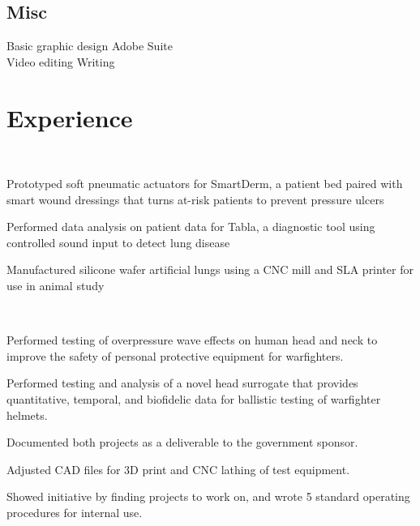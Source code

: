 \documentclass[]{deedy-resume}
\begin{document}
\begin{minipage}[t]{0.3\textwidth}
\subsection{Misc}
Basic graphic design \textbullet{} Adobe Suite\\
Video editing \textbullet{} Writing\\
\sectionsep

%
%

\end{minipage} 
\hfill
\begin{minipage}[t]{0.66\textwidth} 


\section{Experience}
 \\
\vspace{\topsep} %
\begin{tightemize}
\item Prototyped soft pneumatic actuators for SmartDerm, a patient bed paired with smart wound dressings that turns at-risk patients to prevent pressure ulcers
\item Performed data analysis on patient data for Tabla, a diagnostic tool using controlled sound input to detect lung disease
\item Manufactured silicone wafer artificial lungs using a CNC mill and SLA printer for use in animal study
\end{tightemize}
\sectionsep

 \\
\begin{tightemize}
\item Performed testing of overpressure wave effects on human head and neck to improve the safety of personal protective equipment for warfighters.
\item Performed testing and analysis of a novel head surrogate that provides quantitative, temporal, and biofidelic data for ballistic testing of warfighter helmets.
\item Documented both projects as a deliverable to the government sponsor.
\item Adjusted CAD files for 3D print and CNC lathing of test equipment.
\item Showed initiative by finding projects to work on, and wrote 5 standard operating procedures for internal use.
\end{tightemize}
\sectionsep


\end{minipage}
\end{document}
